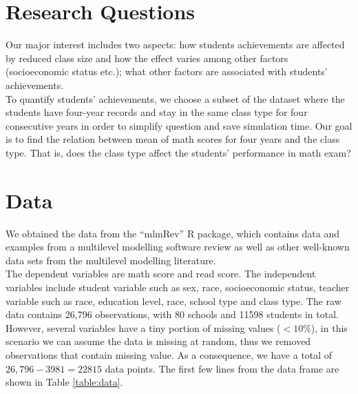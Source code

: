 \documentclass{article}
\begin{document}
\section{Research Questions}

Our major interest includes two aspects: how students achievements are affected by reduced class size and how the effect varies 
among other factors (socioeconomic status etc.); what other factors are associated with students’ achievements. \\

To quantify students’ achievements, we choose a subset of the dataset where the students have four-year records and stay in the 
same class type for four consecutive years  in order to simplify question and save simulation time. Our goal is to find the 
relation between mean of math scores for four years and the class type. That is, does the class type affect the students’ 
performance in math exam?\\

\section{Data}

We obtained the data from the “mlmRev” R package, which contains data and examples from a multilevel modelling software review 
as well as other well-known data sets from the multilevel modelling literature.\\

The dependent variables are math score and read score. The independent variables include student variable such as sex, race, 
socioeconomic status, teacher variable such as race, education level, race, school type and class type. The raw data contains 26,796 
observations, with 80 schools and 11598 students in total. However, several variables have a tiny portion of missing values ($< 10\%$), 
in this scenario we can assume the data is missing at random, thus we removed observations that contain missing value. 
As a consequence, we have a total of $26,796 - 3981 = 22815$ data points. The first few lines from the data frame are shown in Table 
\ref{table:data}.\\
\end{document}
